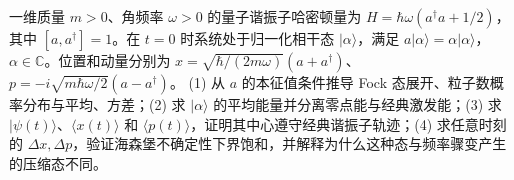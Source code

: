 一维质量 \(m>0\)、角频率 \(\omega>0\) 的量子谐振子哈密顿量为 \(H=\hbar\omega(a^\dagger a+1/2)\)，其中 \([a,a^\dagger]=1\)。在 \(t=0\) 时系统处于归一化相干态 \(|\alpha\rangle\)，满足 \(a|\alpha\rangle=\alpha|\alpha\rangle\)，\(\alpha\in\mathbb C\)。位置和动量分别为 \(x=\sqrt{\hbar/(2m\omega)}(a+a^\dagger)\)、\(p=-i\sqrt{m\hbar\omega/2}(a-a^\dagger)\)。
(1) 从 \(a\) 的本征值条件推导 Fock 态展开、粒子数概率分布与平均、方差；(2) 求 \(|\alpha\rangle\) 的平均能量并分离零点能与经典激发能；(3) 求 \(|\psi(t)\rangle\)、\(\langle x(t)\rangle\) 和 \(\langle p(t)\rangle\)，证明其中心遵守经典谐振子轨迹；(4) 求任意时刻的 \(\Delta x,\Delta p\)，验证海森堡不确定性下界饱和，并解释为什么这种态与频率骤变产生的压缩态不同。
